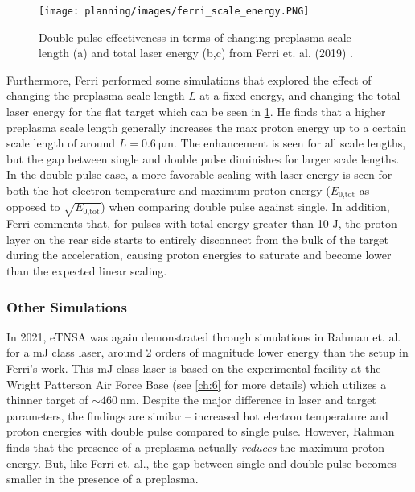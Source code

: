 \begin{figure}
	\centering 
	\texttt{[image: planning/images/ferri\_scale\_energy.PNG]}
	\caption{Double pulse effectiveness in terms of changing preplasma scale length (a) and total laser energy (b,c) from Ferri et. al. (2019) \cite{Ferri_2019_Nat_Comm}.}
	\label{fig:ferri_scale_energy}
\end{figure}

Furthermore, Ferri performed some simulations that explored the effect of changing the preplasma scale length $L$ at a fixed energy, and changing the total laser energy for the flat target \cite{Ferri_2019_Nat_Comm} which can be seen in \cref{fig:ferri_scale_energy}. He finds that a higher preplasma scale length generally increases the max proton energy up to a certain scale length of around $L = \SI{0.6}{\micro \meter}$. The enhancement is seen for all scale lengths, but the gap between single and double pulse diminishes for larger scale lengths. In the double pulse case, a more favorable scaling with laser energy is seen for both the hot electron temperature and maximum proton energy ($E_\text{0,tot}$ as opposed to $\sqrt{E_\text{0,tot}}$) when comparing double pulse against single. In addition, Ferri comments that, for pulses with total energy greater than 10 J, the proton layer on the rear side starts to entirely disconnect from the bulk of the target during the acceleration, causing proton energies to saturate and become lower than the expected linear scaling.

\subsubsection{Other Simulations}
In 2021, \gls{eTNSA} was again demonstrated through simulations in Rahman et. al. \cite{Rahman_2021_PoP} for a mJ class laser, around 2 orders of magnitude lower energy than the setup in Ferri's work. This mJ class laser is based on the experimental facility at the Wright Patterson Air Force Base (see \cref{ch:6} for more details) which utilizes a thinner target of $\sim \SI{460}{\nano \meter}$. Despite the major difference in laser and target parameters, the findings are similar -- increased hot electron temperature and proton energies with double pulse compared to single pulse. However, Rahman finds that the presence of a preplasma actually \emph{reduces} the maximum proton energy. But, like Ferri et. al., the gap between single and double pulse becomes smaller in the presence of a preplasma.

